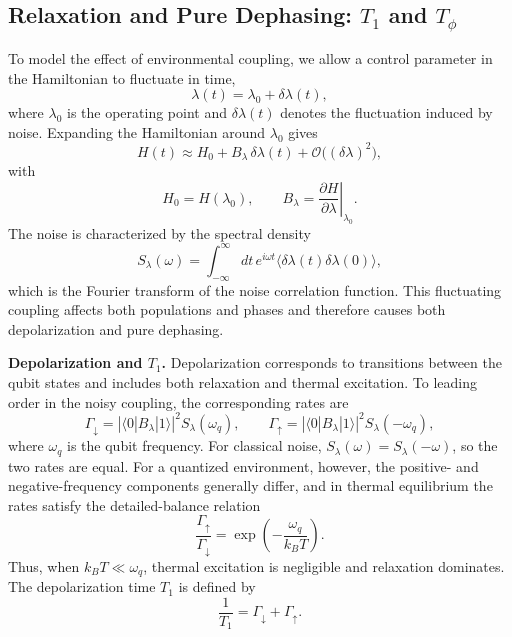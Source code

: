 \subsection{Relaxation and Pure Dephasing: \texorpdfstring{$T_1$ and $T_{\phi}$}{T1 and Tphi}}
\label{subsec:t1-tphi}
To model the effect of environmental coupling, we allow a control parameter in the Hamiltonian to fluctuate in time,
\begin{equation}
    \lambda(t) = \lambda_0 + \delta\lambda(t),
\end{equation}
where \(\lambda_0\) is the operating point and \(\delta\lambda(t)\) denotes the fluctuation induced by noise. Expanding the Hamiltonian around \(\lambda_0\) gives
\begin{equation}
    H(t) \approx H_0 + B_\lambda\,\delta\lambda(t) + \mathcal{O}\big((\delta\lambda)^2\big),
\end{equation}
with
\begin{equation}
    H_0 = H(\lambda_0),
    \qquad
    B_\lambda = \left.\frac{\partial H}{\partial \lambda}\right|_{\lambda_0}.
\end{equation}
The noise is characterized by the spectral density
\begin{equation}
    S_\lambda(\omega)
    =
    \int_{-\infty}^{\infty} dt\, e^{i\omega t}
    \langle \delta\lambda(t)\delta\lambda(0)\rangle,
\end{equation}
which is the Fourier transform of the noise correlation function. This fluctuating coupling affects both populations and phases and therefore causes both depolarization and pure dephasing.

\noindent\textbf{Depolarization and \(T_1\).}
Depolarization corresponds to transitions between the qubit states and includes both relaxation and thermal excitation. To leading order in the noisy coupling, the corresponding rates are \cite{RevModPhys.82.1155}
\begin{equation}
    \Gamma_{\downarrow}
    =
    \left|\langle 0|B_\lambda|1\rangle\right|^2
    S_\lambda(\omega_q),
    \qquad
    \Gamma_{\uparrow}
    =
    \left|\langle 0|B_\lambda|1\rangle\right|^2
    S_\lambda(-\omega_q),
\end{equation}
where \(\omega_q\) is the qubit frequency. For classical noise, \(S_\lambda(\omega)=S_\lambda(-\omega)\), so the two rates are equal. For a quantized environment, however, the positive- and negative-frequency components generally differ, and in thermal equilibrium the rates satisfy the detailed-balance relation \cite{breuer2002quantummaster}
\begin{equation}
    \frac{\Gamma_{\uparrow}}{\Gamma_{\downarrow}}
    =
    \exp\!\left(-\frac{\omega_q}{k_B T}\right).
\end{equation}
Thus, when \(k_B T \ll \omega_q\), thermal excitation is negligible and relaxation dominates. The depolarization time \(T_1\) is defined by
\begin{equation}
    \frac{1}{T_1} = \Gamma_{\downarrow} + \Gamma_{\uparrow}.
\end{equation}

